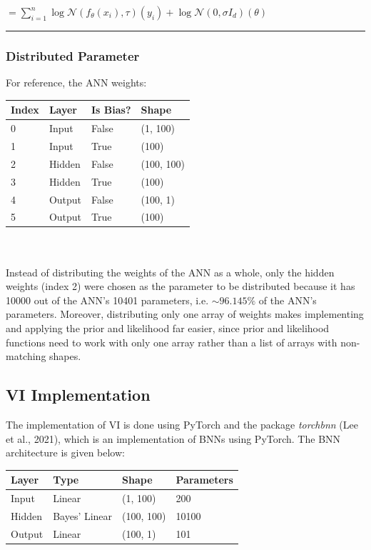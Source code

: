 \documentclass[conference]{IEEEtran}
\begin{document}
$\displaystyle = \sum_{i=1}^n \log \mathcal{N}(f_\theta(x_i), \tau)(y_i) + \log \mathcal{N}(0, \sigma I_d)(\theta)$\\

\par\noindent\rule{0.49\textwidth}{0.1pt}

\subsubsection{Distributed Parameter}
For reference, the ANN weights:\\

\begin{tabular}{| m{1.5cm} | m{1.5cm} | m{1.5cm} | m{1.5cm} |}
    \hline
    \textbf{Index} & \textbf{Layer} & \textbf{Is Bias?}& \textbf{Shape}\\
    \hline
    0 & Input & False & (1, 100)\\
    \hline
    1 & Input & True & (100)\\
    \hline
    2 & Hidden & False & (100, 100)\\
    \hline
    3 & Hidden & True & (100)\\
    \hline
    4 & Output & False & (100, 1)\\
    \hline
    5 & Output & True & (100)\\
    \hline
\end{tabular}\\~\\

Instead of distributing the weights of the ANN as a whole, only the hidden weights (index 2) were chosen as the parameter to be distributed because it has 10000 out of the ANN's 10401 parameters, i.e. $\sim 96.145\%$ of the ANN's parameters. Moreover, distributing only one array of weights makes implementing and applying the prior and likelihood far easier, since prior and likelihood functions need to work with only one array rather than a list of arrays with non-matching shapes.\\

\subsection{VI Implementation}
The implementation of VI is done using PyTorch and the package \textit{torchbnn} (Lee et al., 2021), which is an implementation of BNNs using PyTorch. The BNN architecture is given below:\\

\begin{tabular}{| m{1cm} | m{2cm} | m{1.5cm} | m{2cm} |}
    \hline
    \textbf{Layer} & \textbf{Type} & \textbf{Shape} & \textbf{Parameters}\\
    \hline
    Input & Linear & (1, 100) & 200\\
    \hline
    Hidden & Bayes' Linear & (100, 100) & 10100\\
    \hline
    Output & Linear & (100, 1) & 101\\
    \hline
\end{tabular}\\~\\
\end{document}
